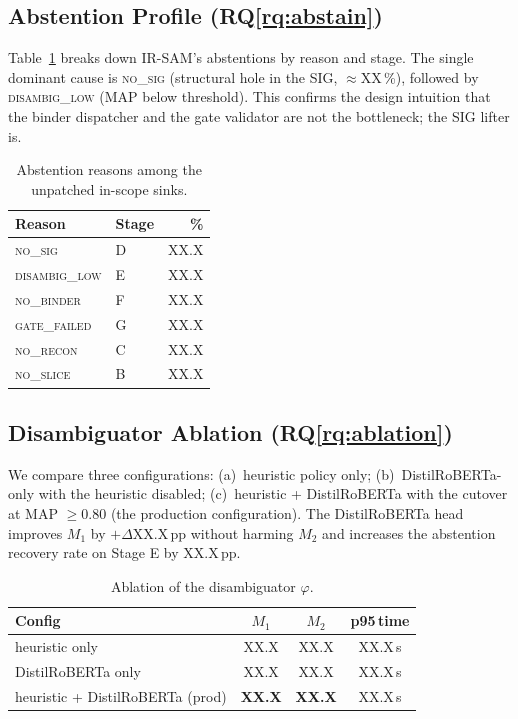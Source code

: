 \documentclass[conference]{IEEEtran}
\newcommand{\IRSAM}{\textsc{IR-SAM}}
\newcommand{\phisig}{\ensuremath{\varphi}}
\newcommand{\rqref}[1]{RQ\ref{rq:#1}}
\begin{document}
\subsection{Abstention Profile (\rqref{abstain})}
Table~\ref{tab:abstain-profile} breaks down \IRSAM's abstentions by
reason and stage.  The single dominant cause is
\textsc{no\_sig} (structural hole in the SIG, $\approx$XX\,\%),
followed by \textsc{disambig\_low} (MAP below threshold).  This
confirms the design intuition that the binder dispatcher and the
gate validator are not the bottleneck; the SIG lifter is.

\begin{table}[t]
\caption{Abstention reasons among the unpatched in-scope sinks.}
\label{tab:abstain-profile}
\centering\small
\begin{tabular}{llr}
\toprule
Reason             & Stage & \%   \\
\midrule
\textsc{no\_sig}        & D & XX.X \\
\textsc{disambig\_low}  & E & XX.X \\
\textsc{no\_binder}     & F & XX.X \\
\textsc{gate\_failed}   & G & XX.X \\
\textsc{no\_recon}      & C & XX.X \\
\textsc{no\_slice}      & B & XX.X \\
\bottomrule
\end{tabular}
\end{table}

\subsection{Disambiguator Ablation (\rqref{ablation})}
We compare three configurations: (a)~heuristic policy only;
(b)~DistilRoBERTa-only with the heuristic disabled;
(c)~heuristic + DistilRoBERTa with the cutover at MAP $\geq 0.80$
(the production configuration). The DistilRoBERTa head improves
$M_1$ by $+\Delta$XX.X\,pp without harming $M_2$ and increases
the abstention recovery rate on Stage E by XX.X\,pp.

\begin{table}[t]
\caption{Ablation of the disambiguator $\phisig$.}
\label{tab:abl}
\centering\small
\begin{tabular}{lccc}
\toprule
Config                              & $M_1$ & $M_2$ & p95\,time \\
\midrule
heuristic only                      & XX.X & XX.X & XX.X\,s \\
DistilRoBERTa only                  & XX.X & XX.X & XX.X\,s \\
heuristic + DistilRoBERTa (prod)    & \textbf{XX.X} & \textbf{XX.X} & XX.X\,s \\
\bottomrule
\end{tabular}
\end{table}
\end{document}
